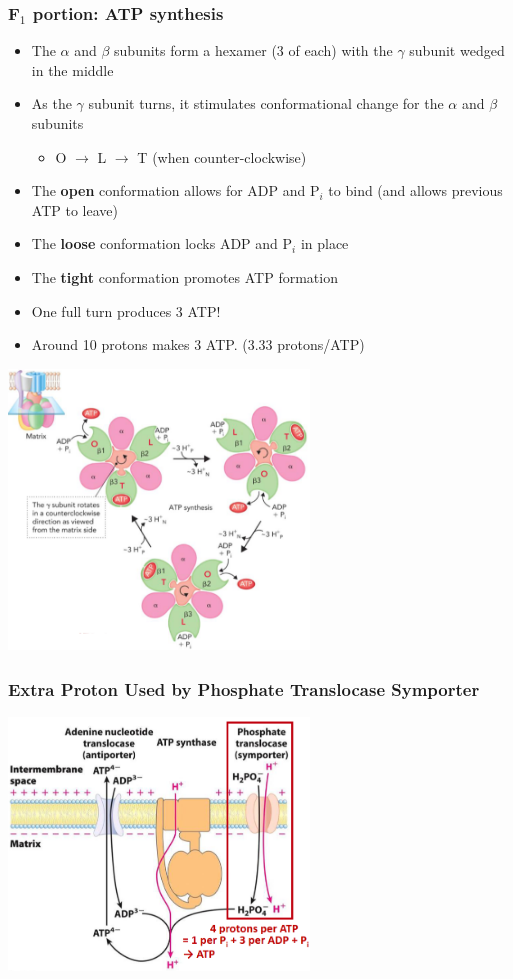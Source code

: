 \documentclass[10pt]{article}
\begin{document}
\subsubsection*{F$_1$ portion: ATP synthesis}
\begin{itemize}
	\item The $\alpha$ and $\beta$ subunits form a hexamer (3 of each) with the $\gamma$ subunit wedged in the middle
	\item As the $\gamma$ subunit turns, it stimulates conformational change for the $\alpha$ and $\beta$ subunits
	\begin{itemize}
        \item O $\rightarrow$ L $\rightarrow$ T (when counter-clockwise)
    \end{itemize}
    \item The \textbf{open} conformation allows for ADP and P$_i$ to bind (and allows previous ATP to leave)
    \item The \textbf{loose} conformation locks ADP and P$_i$ in place
    \item The \textbf{tight} conformation promotes ATP formation
    \item One full turn produces 3 ATP!
    \item Around 10 protons makes 3 ATP.  (3.33 protons/ATP)
\end{itemize}
\begin{center} 
	\includegraphics*[width=0.6\textwidth]{L3_4.png}
\end{center}

\subsubsection*{Extra Proton Used by Phosphate Translocase Symporter}
\begin{center} 
	\includegraphics*[width=0.6\textwidth]{L3_5.png}
\end{center}
\end{document}
